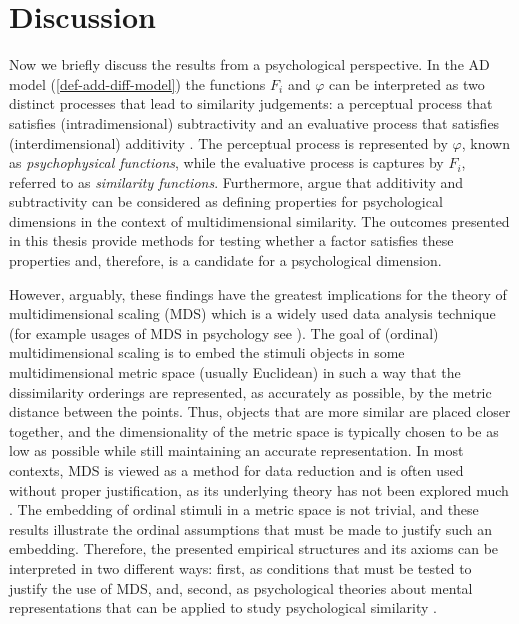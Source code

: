 \chapter{Discussion} \label{chap-disc}

Now we briefly discuss the results from a psychological perspective.
In the AD model (\cref{def-add-diff-model}) the functions $F_i$ and $\varphi$ can be interpreted as two distinct processes that lead to similarity judgements: a perceptual process that satisfies (intradimensional) subtractivity and an evaluative process that satisfies (interdimensional) additivity \parencite{tversky1970dimensional}.
The perceptual process is represented by $\varphi$, known as \emph{psychophysical functions}, while the evaluative process is captures by $F_i$, referred to as \emph{similarity functions}.
Furthermore, \textcite{tversky1970dimensional} argue that additivity and subtractivity can be considered as defining properties for psychological dimensions in the context of multidimensional similarity. The outcomes presented in this thesis provide methods for testing whether a factor satisfies these properties and, therefore, is a candidate for a psychological dimension.

However, arguably, these findings have the greatest implications for the theory of multidimensional scaling (MDS) which is a widely used data analysis technique (for example usages of MDS in psychology see \textcite{psychoMDS}).
The goal of (ordinal) multidimensional scaling is to embed the stimuli objects in some multidimensional metric space (usually Euclidean) in such a way that the dissimilarity orderings are represented, as accurately as possible, by the metric distance between the points.
Thus, objects that are more similar are placed closer together, and the dimensionality of the metric space is typically chosen to be as low as possible while still maintaining an accurate representation.
In most contexts, MDS is viewed as a method for data reduction and is often used without proper justification, as its underlying theory has not been explored much \parencite{foundationsMDS}.
The embedding of ordinal stimuli in a metric space is not trivial, and these results illustrate the ordinal assumptions that must be made to justify such an embedding.
Therefore, the presented empirical structures and its axioms can be interpreted in two different ways: first, as conditions that must be tested to justify the use of MDS, and, second, as psychological theories about mental representations that can be applied to study psychological similarity \parencite{foundationsMDS, tversky1970dimensional, foundations2}.

